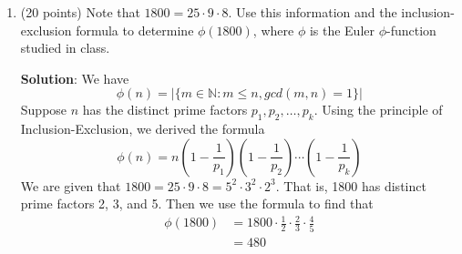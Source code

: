 \documentclass[12pt]{article}
\newenvironment{solution}{
\begin{mdframed}
  { {\bfseries Solution}: }}{
\end{mdframed}}
\begin{document}
\begin{enumerate}
    \begin{solution}
      \begin{enumerate}[label=({\alph*})]
        \item Suppose that a particular solution \(h\) has the form \(h = C \cdot 3^{n}\). Then we have
        \begin{align*}
          (A^{2} - 3A + 5) (C \cdot 3^{n}) &= 4 \cdot 3^{n} \\
          C \cdot 3^{n+2} - 3C \cdot 3^{n+1} + 5C \cdot 3^{n}  &= 4 \cdot 3^{n} \\
          9C \cdot 3^{n} - 9C \cdot 3^{n} + 5C \cdot 3^{n} &= 4 \cdot 3^{n} \\
          5C &= 4 \\
          C = \frac{4}{5}
        \end{align*}
        Thus, we have a particular solution \(h = \frac{4}{5} \cdot 3^{n}\).

        \item We use the theorem describing the general solution to homogeneous recurrence relations. Then the general solution is
        \begin{align*}
          f &= C_{1} \cdot (7 - 2i)^{n} + C_{2} \cdot n (7 - 2i)^{n} + C_{3} \cdot n^{2} (7 - 2i)^{n} \\
          &+ C_{4} + C_{5} \cdot n + C_{6} \cdot n^{2} + C_{7} \cdot n^{3} + C_{8} \cdot n^{4}
        \end{align*}
      \end{enumerate}
    \end{solution}

    \pagebreak

    \item (20 points) Note that \(1800 = 25 \cdot 9 \cdot 8\). Use this information and the inclusion-exclusion formula to determine \(\phi(1800)\), where \(\phi\) is the Euler \(\phi\)-function studied in class.

    \begin{solution}
      We have
      \begin{equation*}
        \phi(n) =  |\{m \in \mathbb{N} : m \leq n, gcd(m,n) = 1\}|
      \end{equation*}
      Suppose \(n\) has the distinct prime factors \(p_{1}, p_{2}, \ldots, p_{k}\). Using the principle of Inclusion-Exclusion, we derived the formula
      \begin{equation*}
        \phi(n) = n\left(1 - \frac{1}{p_{1}}\right) \left(1 - \frac{1}{p_{2}} \right) \cdots \left(1 - \frac{1}{p_{k}} \right)
      \end{equation*}
      We are given that \(1800 = 25 \cdot 9 \cdot 8 = 5^{2} \cdot 3^{2} \cdot 2^{3}\). That is, 1800 has distinct prime factors 2, 3, and 5. Then we use the formula to find that
      \begin{align*}
        \phi(1800) &= 1800 \cdot \frac{1}{2} \cdot \frac{2}{3} \cdot \frac{4}{5} \\
        &= 480
      \end{align*}
    \end{solution}
  \end{enumerate}
\end{document}
